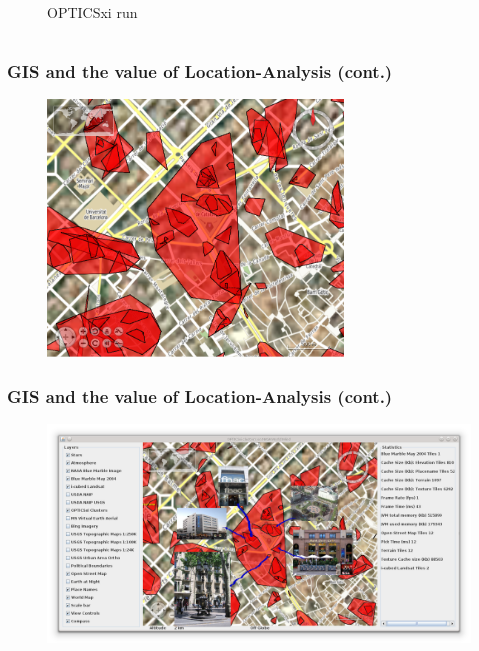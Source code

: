 \documentclass[hyperref={pdfpagelabels=true}]{beamer}
\begin{document}
\begin{frame}
\begin{columns}
\begin{column}{0.5\textwidth}
\begin{figure}
           \tiny{OPTICSxi run}%
       \end{figure}  
  \end{column}  
\end{columns}
\end{frame}

\begin{frame}
\frametitle{GIS and the value of Location-Analysis (cont.)}
  \begin{figure}   
    \includegraphics[width=0.7\textwidth]{250_035_11_w_p_catalunyal.png}   
  \end{figure}     
\end{frame}

\begin{frame}
\frametitle{GIS and the value of Location-Analysis (cont.)}
  \begin{figure}   
    \includegraphics[width=\textwidth]{case_study.png}   
  \end{figure}     
\end{frame}
\end{document}
